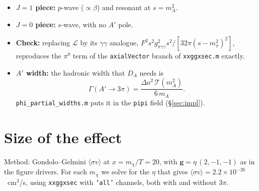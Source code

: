 \documentclass{article}
\newcommand{\mpi}{m_\pi}
\newcommand{\Da}{\Delta a}
\begin{document}
\begin{itemize}
\item \textbf{$J=1$ piece:} $p$-wave ($\propto\beta$) and resonant at $s=m_A^2$.
\item \textbf{$J=0$ piece:} $s$-wave, with no $A'$ pole.
\item \textbf{Check:} replacing $\mathcal L$ by its $\gamma\gamma$ analogue,
  $F^2s^2g_{\pi\gamma\gamma}^2s^2/[32\pi(s-\mpi^2)^2]$, reproduces the $\pi^0$ term of the
  \texttt{axialVector} branch of \texttt{xxggxsec.m} exactly.
\item \textbf{$A'$ width:} the hadronic width that $D_A$ needs is
  \begin{equation}
    \Gamma(A'\to3\pi)=\frac{\Da^2\,\mathcal T(m_A^2)}{6\,m_A}.
  \end{equation}
  \texttt{phi\_partial\_widths.m} puts it in the \texttt{pipi} field (\S\ref{sec:impl}).
\end{itemize}

\section{Size of the effect}
\label{sec:numbers}

Method: Gondolo--Gelmini $\langle\sigma v\rangle$ at $x=m_\chi/T=20$, with
$\mathbf g=\eta\,(2,-1,-1)$ as in the figure drivers. For each $m_\chi$ we solve for the $\eta$ that
gives $\langle\sigma v\rangle=2.2\times10^{-26}$~cm$^3$/s, using \texttt{xxggxsec} with
\texttt{'all'} channels, both with and without $3\pi$.
\end{document}
